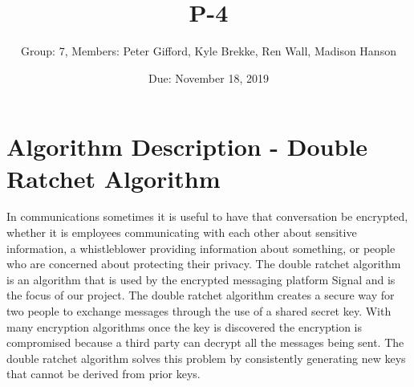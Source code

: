 \documentclass{article}
\title{P-4}
\author{Group: 7, Members: Peter Gifford, Kyle Brekke, Ren Wall, Madison Hanson}
\date{Due: November 18, 2019}
\begin{document}
\maketitle

\section{Algorithm Description - Double Ratchet Algorithm}

In communications sometimes it is useful to have that conversation be encrypted, whether it is employees communicating with each other about sensitive information, a whistleblower providing information about something, or people who are concerned about protecting their privacy. The double ratchet algorithm is an algorithm that is used by the encrypted messaging platform Signal and is the focus of our project. The double ratchet algorithm creates a secure way for two people to exchange messages through the use of a shared secret key. With many encryption algorithms once the key is discovered the encryption is compromised because a third party can decrypt all the messages being sent. The double ratchet algorithm solves this problem by consistently generating new keys that cannot be derived from prior keys. \newline
\end{document}
